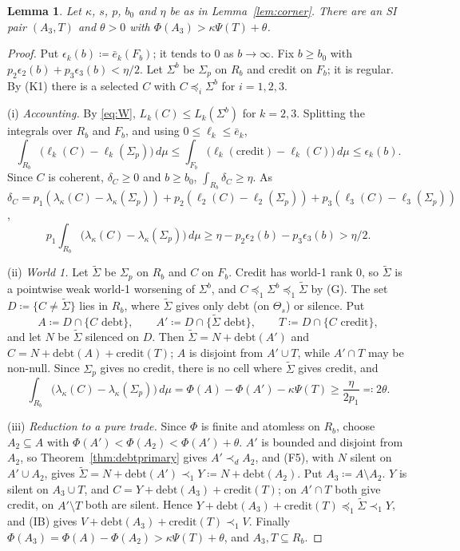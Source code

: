 \documentclass[11pt]{article}
\newtheorem{lemma}[theorem]{Lemma}
\theoremstyle{definition}\newtheorem{definition}[theorem]{Definition}
\theoremstyle{remark}\newtheorem{remark}[theorem]{Remark}
\newcommand{\debt}{\mathrm{debt}}
\newcommand{\cred}{\mathrm{credit}}
\begin{document}
\begin{lemma}\label{lem:kkmsilent}
Let $\kappa$, $s$, $p$, $b_0$ and $\eta$ be as in Lemma~\ref{lem:corner}.
There are an SI pair $(A_3,T)$ and $\theta>0$ with
$\Phi(A_3)>\kappa\Psi(T)+\theta$.
\end{lemma}
\begin{proof}
Put $\epsilon_k(b)\coloneqq \bar e_k(F_b)$; it tends to $0$ as $b\to\infty$. Fix
$b\ge b_0$ with $p_2\epsilon_2(b)+p_3\epsilon_3(b)<\eta/2$. Let $\Sigma^b$
be $\Sigma_p$ on $R_b$ and credit on $F_b$; it is regular. By (K1) there is a
selected $C$ with $C\preceq_i\Sigma^b$ for $i=1,2,3$.

(i) \emph{Accounting.} By \eqref{eq:W}, $L_k(C)\le L_k(\Sigma^b)$ for
$k=2,3$. Splitting the integrals over $R_b$ and $F_b$, and using $0\le\ell_k\le
\bar e_k$,
\[
 \int_{R_b}\bigl(\ell_k(C)-\ell_k(\Sigma_p)\bigr)\,d\mu
 \le\int_{F_b}\bigl(\ell_k(\cred)-\ell_k(C)\bigr)\,d\mu\le\epsilon_k(b).
\]
Since $C$ is coherent, $\delta_C\ge0$ and $b\ge b_0$,
$\int_{R_b}\delta_C\ge\eta$. As
$\delta_C=p_1(\lambda_\kappa(C)-\lambda_\kappa(\Sigma_p))+p_2(\ell_2(C)-
\ell_2(\Sigma_p))+p_3(\ell_3(C)-\ell_3(\Sigma_p))$,
\[
 p_1\int_{R_b}\bigl(\lambda_\kappa(C)-\lambda_\kappa(\Sigma_p)\bigr)\,d\mu
 \ge\eta-p_2\epsilon_2(b)-p_3\epsilon_3(b)>\eta/2 .
\]

(ii) \emph{World 1.} Let $\widetilde\Sigma$ be $\Sigma_p$ on $R_b$ and $C$ on
$F_b$. Credit has world-1 rank $0$, so $\widetilde\Sigma$ is a pointwise weak
world-1 worsening of $\Sigma^b$, and $C\preceq_1\Sigma^b\preceq_1
\widetilde\Sigma$ by (G). The set $D\coloneqq\{C\ne\widetilde\Sigma\}$ lies
in $R_b$, where $\widetilde\Sigma$ gives only debt (on $\Theta_s$) or
silence. Put
\[
 A\coloneqq D\cap\{C\text{ debt}\},\qquad A'\coloneqq D\cap\{\widetilde\Sigma
 \text{ debt}\},\qquad T\coloneqq D\cap\{C\text{ credit}\},
\]
and let $N$ be $\widetilde\Sigma$ silenced on $D$. Then
$\widetilde\Sigma=N+\debt(A')$ and $C=N+\debt(A)+\cred(T)$; $A$ is disjoint
from $A'\cup T$, while $A'\cap T$ may be non-null. Since $\Sigma_p$ gives no
credit, there is no cell where $\widetilde\Sigma$ gives credit, and
\[
 \int_{R_b}\bigl(\lambda_\kappa(C)-\lambda_\kappa(\Sigma_p)\bigr)\,d\mu
 =\Phi(A)-\Phi(A')-\kappa\Psi(T)\ge\frac\eta{2p_1}\eqqcolon2\theta .
\]

(iii) \emph{Reduction to a pure trade.} Since $\Phi$ is finite and atomless
on $R_b$, choose $A_2\subseteq A$ with $\Phi(A')<\Phi(A_2)<\Phi(A')+\theta$.
$A'$ is bounded and disjoint from $A_2$, so Theorem~\ref{thm:debtprimary}
gives $A'\prec_dA_2$, and (F5), with $N$ silent on $A'\cup A_2$, gives
$\widetilde\Sigma=N+\debt(A')\prec_1Y\coloneqq N+\debt(A_2)$. Put
$A_3\coloneqq A\setminus A_2$. $Y$ is silent on $A_3\cup T$, and
$C=Y+\debt(A_3)+\cred(T)$; on $A'\cap T$ both give credit, on $A'\setminus T$
both are silent. Hence $Y+\debt(A_3)+\cred(T)\preceq_1\widetilde\Sigma
\prec_1Y$, and (IB) gives $V+\debt(A_3)+\cred(T)\prec_1V$. Finally
$\Phi(A_3)=\Phi(A)-\Phi(A_2)>\kappa\Psi(T)+\theta$, and $A_3,T\subseteq R_b$.
\end{proof}
\end{document}
